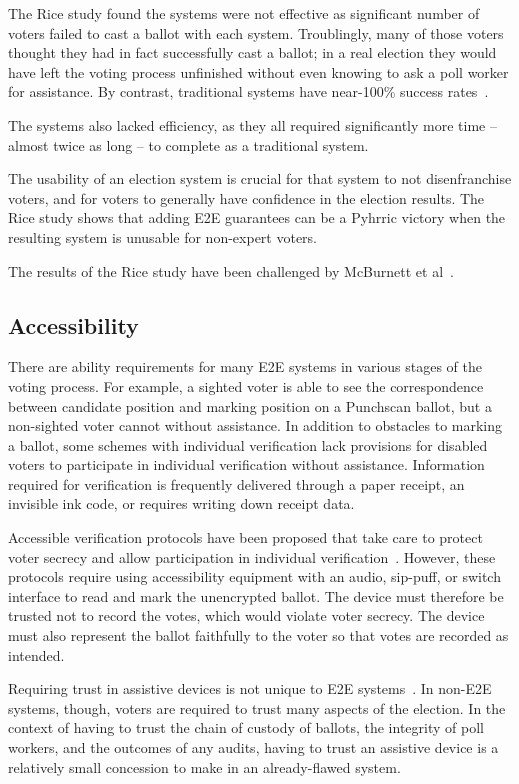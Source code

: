 The Rice study found the systems were not effective as significant
number of voters failed to cast a ballot with each
system. Troublingly, many of those voters thought they had in fact
successfully cast a ballot; in a real election they would have left
the voting process unfinished without even knowing to ask a poll
worker for assistance. By contrast, traditional systems have
near-100\% success rates~\cite{byrne2007usability}.

The systems also lacked efficiency, as they all required significantly
more time -- almost twice as long -- to complete as a traditional
system.

The usability of an election system is crucial for that system to not
disenfranchise voters, and for voters to generally have confidence in
the election results. The Rice study shows that adding E2E guarantees
can be a Pyhrric victory when the resulting system is unusable for
non-expert voters.

The results of the Rice study have been challenged by McBurnett et al~\cite{mcburnett2014}. 
\subsection{Accessibility}

There are ability requirements for many E2E systems in various stages
of the voting process. For example, a sighted voter is able to see the
correspondence between candidate position and marking position on a
Punchscan ballot, but a non-sighted voter cannot without
assistance. In addition to obstacles to marking a ballot, some schemes with
individual verification lack provisions for disabled voters to
participate in individual verification without assistance. Information
required for verification is frequently delivered through a paper
receipt, an invisible ink code, or requires writing down receipt
data.

Accessible verification protocols have been proposed that take care to
protect voter secrecy and allow participation in individual
verification~\cite{chaum2009accessible}. However, these protocols
require using accessibility equipment with an audio, sip-puff, or
switch interface to read and mark the unencrypted ballot. The device
must therefore be trusted not to record the votes, which would violate
voter secrecy. The device must also represent the ballot faithfully to
the voter so that votes are recorded as intended.

Requiring trust in assistive devices is not unique to E2E
systems~\cite{runyan2007improving}. In non-E2E systems, though, voters are required to trust many aspects of the election. In the context of having to trust the
chain of custody of ballots, the integrity of poll workers, and the
outcomes of any audits, having to trust an assistive device is a
relatively small concession to make in an already-flawed system.

